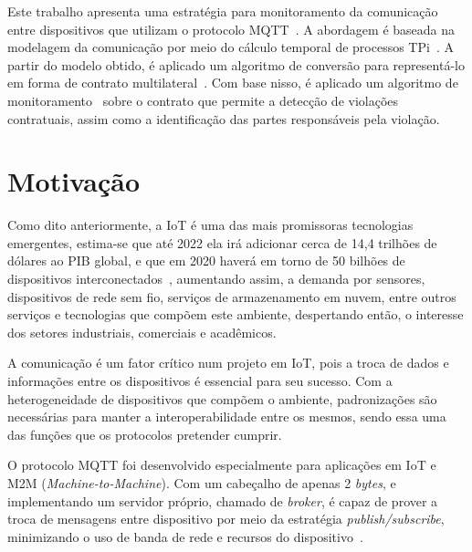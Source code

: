 
Este trabalho apresenta uma estratégia para monitoramento da comunicação entre dispositivos que utilizam o protocolo MQTT~\cite{mqttv3.1.1}. A abordagem é baseada na modelagem da comunicação por meio do cálculo temporal de processos TPi~\cite{berger2003two}. A partir do modelo obtido, é aplicado um algoritmo de conversão para representá-lo em forma de contrato multilateral~\cite{xu2004multi}. Com base nisso, é aplicado um algoritmo de monitoramento~\cite{xu2004multi, xu2005detection} sobre o contrato que permite a detecção de violações contratuais, assim como a identificação das partes responsáveis pela violação.

\section{Motivação}

Como dito anteriormente, a IoT é uma das mais promissoras tecnologias emergentes, estima-se que até 2022 ela irá adicionar cerca de 14,4 trilhões de dólares ao PIB global, e que em 2020 haverá em torno de 50 bilhões de dispositivos interconectados~\cite{morgan2014forbes}, aumentando assim, a demanda por sensores, dispositivos de rede sem fio, serviços de armazenamento em nuvem, entre outros serviços e tecnologias que compõem este ambiente, despertando então, o interesse dos setores industriais, comerciais e acadêmicos.

A comunicação é um fator crítico num projeto em IoT, pois a troca de dados e informações entre os dispositivos é essencial para seu sucesso. Com a heterogeneidade de dispositivos que compõem o ambiente, padronizações são necessárias para manter a interoperabilidade entre os mesmos, sendo essa uma das funções que os protocolos pretender cumprir.

O protocolo MQTT foi desenvolvido especialmente para aplicações em IoT e M2M (\textit{Machine-to-Machine}). Com um cabeçalho de apenas 2 \textit{bytes}, e implementando um servidor próprio, chamado de \textit{broker}, é capaz de prover a troca de mensagens entre dispositivo por meio da estratégia \textit{publish/subscribe}, minimizando o uso de banda de rede e recursos do dispositivo~\cite{mqttv3.1.1}. 


